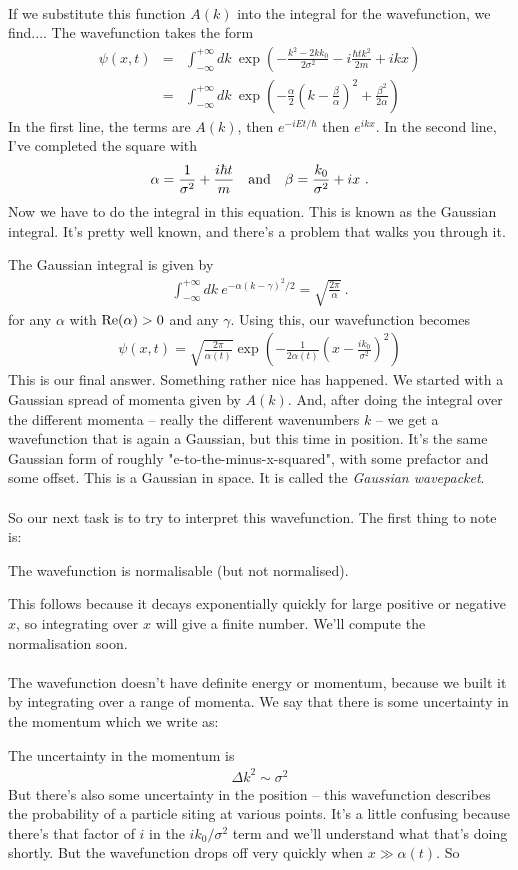 \documentclass[12pt]{article}
\def\be{\begin{eqnarray}}
\def\ee{\end{eqnarray}}
\newcommand{\nn}{\nonumber}
\newcommand\para{\paragraph{}}
\begin{document}
\para
If we substitute this function $A(k)$ into the integral for the wavefunction, we find....{\color{olive} The wavefunction takes the form
%
\be \psi(x,t) &=& \int_{-\infty}^{+\infty} dk \ \exp\left(-\frac{k^2-2kk_0}{2\sigma^2} -i\frac{\hbar t k^2}{2m} + ikx\right)\nn\\
&=& \int_{-\infty}^{+\infty} dk\ \exp\left(-\frac{\alpha}{2}\left( k-\frac{\beta}{\alpha}\right)^2 + \frac{\beta^2}{2\alpha}\right)
\nn\ee
%
} In the first line, the terms are $A(k)$, then $e^{-iEt/\hbar}$ then $e^{ikx}$. In the second line, I've completed the square {\color{olive} with
%
\be \alpha = \frac{1}{\sigma^2}  + \frac{i\hbar t}{m}\  \ \ {\rm and}\ \ \ \beta =  \frac{k_0}{\sigma^2}+ ix\ .\nn\ee
%
}Now we have to do the integral in this equation. This is known as the Gaussian integral. It's pretty well known, and there's a problem that walks you through it. 

{\color{olive} The Gaussian integral is given by 
%
\be\int_{-\infty}^{+\infty} dk\ e^{-\alpha(k-\gamma)^2/2} = \sqrt{\frac{2\pi}{\alpha}}\ .\ee
%
for any $\alpha$ with ${\rm Re}(\alpha)>0$ and any $\gamma$. Using this, our wavefunction becomes
%
\be \psi(x,t) = \sqrt{\frac{2\pi}{\alpha(t)}}\exp\left(-\frac{1}{2\alpha(t)}\left(x-\frac{ik_0}{\sigma^2}\right)^2\right)\nn\ee
%
} This is our final answer. Something rather nice has happened. We started with a Gaussian spread of momenta given by $A(k)$. And, after doing the integral over the different momenta -- really the different wavenumbers $k$ -- we get a wavefunction that is again a Gaussian, but this time in position. It's the same Gaussian form of roughly "e-to-the-minus-x-squared", with some prefactor and some offset. {\color{olive} This is a Gaussian in space. It is called the {\it Gaussian wavepacket}.}

\para
So our next task is to try to interpret this wavefunction. The first thing to note is:

{\color{olive} The wavefunction is normalisable (but not normalised)}.

This follows because it decays exponentially quickly for large positive or negative $x$, so integrating over $x$ will give a finite number. We'll compute the normalisation soon.

\para
The wavefunction doesn't have definite energy or momentum, because we built it by integrating over a range of momenta. We say that there is some uncertainty in the momentum which we write as:

{\color{olive} The uncertainty in the momentum is
%
\be \Delta k^2 \sim \sigma^2\nn\ee
%
}But there's also some uncertainty in the position -- this wavefunction describes the probability of a particle siting at various points. It's a little confusing because there's that factor of $i$ in the $ik_0/\sigma^2$ term and we'll understand what that's doing shortly. But the wavefunction drops off very quickly when $x\gg \alpha(t)$. So 
\end{document}
